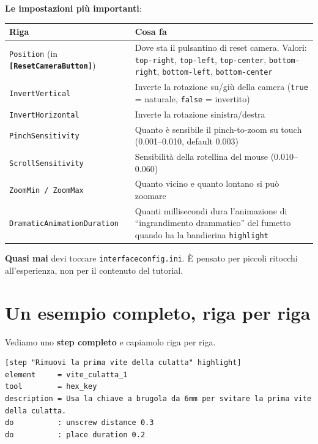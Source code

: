 ﻿\documentclass[a4paper,12pt,oneside]{book}
\newcommand{\val}[1]{\texttt{\color{cvtgreen}#1}}
\newcommand{\sez}[1]{\texttt{\color{sectioncolor}\textbf{#1}}}
\newcommand{\file}[1]{\texttt{#1}}
\begin{document}
\textbf{Le impostazioni più importanti}:

\begin{longtable}{@{}lp{10cm}@{}}
\toprule
\textbf{Riga} & \textbf{Cosa fa} \\
\midrule
\val{Position} (in \sez{[ResetCameraButton]}) & Dove sta il pulsantino di reset
camera. Valori: \texttt{top-right}, \texttt{top-left}, \texttt{top-center},
\texttt{bottom-right}, \texttt{bottom-left}, \texttt{bottom-center} \\
\val{InvertVertical} & Inverte la rotazione su/giù della camera (\texttt{true}
= naturale, \texttt{false} = invertito) \\
\val{InvertHorizontal} & Inverte la rotazione sinistra/destra \\
\val{PinchSensitivity} & Quanto è sensibile il pinch-to-zoom su touch
(0.001--0.010, default 0.003) \\
\val{ScrollSensitivity} & Sensibilità della rotellina del mouse
(0.010--0.060) \\
\val{ZoomMin / ZoomMax} & Quanto vicino e quanto lontano si può zoomare \\
\val{DramaticAnimationDuration} & Quanti millisecondi dura l'animazione di
``ingrandimento drammatico'' del fumetto quando ha la bandierina \val{highlight}
\\
\bottomrule
\end{longtable}

\begin{regola}
\textbf{Quasi mai} devi toccare \file{interfaceconfig.ini}. È pensato per
piccoli ritocchi all'esperienza, non per il contenuto del tutorial.
\end{regola}

\chapter{Un esempio completo, riga per riga}
\label{ch:esempio}

Vediamo uno \textbf{step completo} e capiamolo riga per riga.

\begin{esempiocvt}
\begin{lstlisting}
[step "Rimuovi la prima vite della culatta" highlight]
element     = vite_culatta_1
tool        = hex_key
description = Usa la chiave a brugola da 6mm per svitare la prima vite della culatta.
do          : unscrew distance 0.3
do          : place duration 0.2
\end{lstlisting}
\end{esempiocvt}
\end{document}
